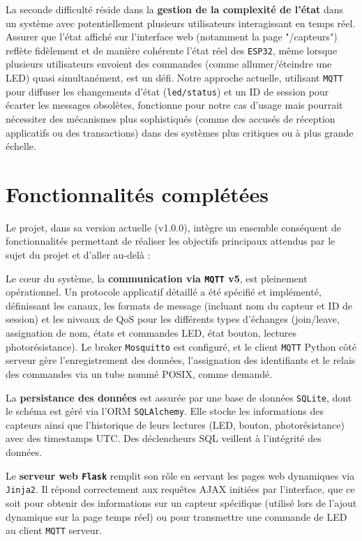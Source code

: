 \documentclass[12pt]{article}
\begin{document}
La seconde difficulté réside dans la \textbf{gestion de la complexité de l'état} dans un système avec potentiellement plusieurs utilisateurs interagissant en temps réel. Assurer que l'état affiché sur l'interface web (notamment la page "/capteurs") reflète fidèlement et de manière cohérente l'état réel des \texttt{ESP32}, même lorsque plusieurs utilisateurs envoient des commandes (comme allumer/éteindre une LED) quasi simultanément, est un défi. Notre approche actuelle, utilisant \texttt{MQTT} pour diffuser les changements d'état (\texttt{led/status}) et un ID de session pour écarter les messages obsolètes, fonctionne pour notre cas d'usage mais pourrait nécessiter des mécanismes plus sophistiqués (comme des accusés de réception applicatifs ou des transactions) dans des systèmes plus critiques ou à plus grande échelle.

\section{Fonctionnalités complétées}

Le projet, dans sa version actuelle (v1.0.0), intègre un ensemble conséquent de fonctionnalités permettant de réaliser les objectifs principaux attendus par le sujet du projet et d'aller au-delà :

Le cœur du système, la \textbf{communication via \texttt{MQTT} v5}, est pleinement opérationnel. Un protocole applicatif détaillé a été spécifié et implémenté, définissant les canaux, les formats de message (incluant nom du capteur et ID de session) et les niveaux de QoS pour les différents types d'échanges (join/leave, assignation de nom, états et commandes LED, état bouton, lectures photorésistance). Le broker \texttt{Mosquitto} est configuré, et le client \texttt{MQTT} Python côté serveur gère l'enregistrement des données, l'assignation des identifiants et le relais des commandes via un tube nommé POSIX, comme demandé.

La \textbf{persistance des données} est assurée par une base de données \texttt{SQLite}, dont le schéma est géré via l'ORM \texttt{SQLAlchemy}. Elle stocke les informations des capteurs ainsi que l'historique de leurs lectures (LED, bouton, photorésistance) avec des timestamps UTC. Des déclencheurs SQL veillent à l'intégrité des données.

Le \textbf{serveur web \texttt{Flask}} remplit son rôle en servant les pages web dynamiques via \texttt{Jinja2}. Il répond correctement aux requêtes AJAX initiées par l'interface, que ce soit pour obtenir des informations sur un capteur spécifique (utilisé lors de l'ajout dynamique sur la page temps réel) ou pour transmettre une commande de LED au client \texttt{MQTT} serveur.
\end{document}
